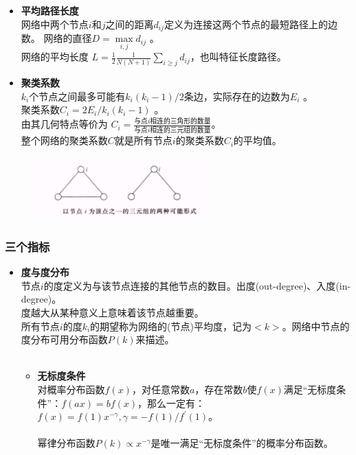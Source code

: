 \begin{frame}

	
	\begin{itemize}
		\item \textbf{平均路径长度}  \\
				网络中两个节点$i$和$j$之间的距离$d_{ij}$定义为连接这两个节点的最短路径上的边数。
				网络的直径$ D = \max\limits_{i,j}d_{ij}$ 。\\
				网络的平均长度 $L = \frac{1}{2} \frac{1}{N(N+1)}\sum\limits_{i \ge j}d_{ij}$，也叫特征长度路径。\\
		\item \textbf{聚类系数} \\
				$k_i$个节点之间最多可能有$k_i (k_i - 1)/2$条边，实际存在的边数为$E_i$ 。$ \text{聚类系数} C_i = 2E_i / k_i (k_i - 1)$ 。\\
				由其几何特点等价为 $C_i = \frac{\text{与点}i\text{相连的三角形的数量} }{\text{与点}i\text{相连的三元组的数量}}$。\\
				整个网络的聚类系数$C$就是所有节点$i$的聚类系数$C_i$的平均值。
	
	\end{itemize}

	\begin{figure}[htbp]
		\centering
		\includegraphics[width=0.6\textwidth, bb = 0 0 1248 449]{pic/01-three.png}
	\end{figure}

	

\end{frame}


\begin{frame}
	\frametitle{三个指标}
	\begin{itemize}
		\item \textbf{度与度分布}\\
				节点$i$的度定义为与该节点连接的其他节点的数目。出度(out-degree)、入度(in-degree)。\\
				度越大从某种意义上意味着该节点越重要。 \\
				所有节点$i$的度$k_i$的期望称为网络的(节点)平均度，记为$<k>$。网络中节点的度分布可用分布函数$P(k)$来描述。\\
				~\\
				\begin{itemize}
					\item \textbf{无标度条件} \\
					对概率分布函数$f(x)$，对任意常数$a$，存在常数$b$使$f(x)$满足“无标度条件”：$f(ax)=bf(x)$，那么一定有：$f(x)=f(1)x^{-\gamma}, \gamma = -f(1)/f^{\prime}(1)$。\\
					~\\
					幂律分布函数$P(k)\propto x^{-\gamma}$是唯一满足“无标度条件”的概率分布函数。
				\end{itemize}
			
	\end{itemize}
\end{frame}

